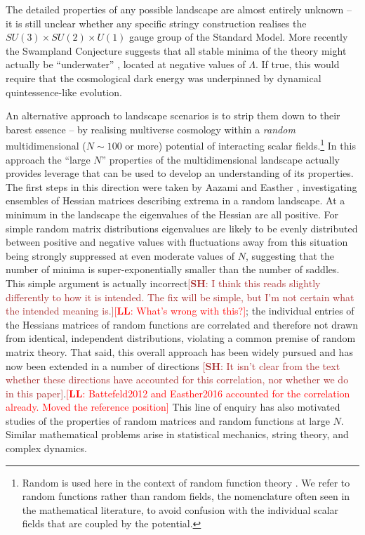 \documentclass[12pt]{article}
\newcommand{\lfl}[1]{\textcolor{red}{[{\bf LL}: #1]}}
\newcommand{\SH}[1]{\textcolor{brown}{[{\bf SH}: #1]}}
\begin{document}
The detailed properties of any possible landscape are almost entirely unknown -- it is still unclear whether any specific stringy construction  realises  the $SU(3) \times SU(2) \times U(1)$ gauge group of the Standard Model.  More recently the Swampland Conjecture suggests that all stable minima of the theory might actually be ``underwater'' \cite{Agrawal2018},  located at negative values of $\Lambda$. If true, this would require that the cosmological dark energy was underpinned by dynamical quintessence-like evolution.  

An alternative approach to   landscape scenarios is to strip them down to their barest essence -- by realising multiverse cosmology within a {\em random\/} multidimensional ($N\sim100$ or more) potential of interacting scalar fields.\footnote{Random is used here in the  context of random function theory \cite{GRF1, GRF2, GRF3}.  We refer to random functions rather than random fields, the nomenclature often seen in the mathematical literature, to avoid confusion with the individual scalar fields that are coupled by the potential.}  In this approach the ``large $N$'' properties of the multidimensional landscape actually provides leverage that can be used to develop an understanding of its properties. The first steps in this direction were taken by Aazami and Easther \cite{Aazami2006}, investigating ensembles of Hessian matrices describing extrema in a random landscape.  At  a minimum in the landscape the eigenvalues of the Hessian are all positive. For simple random matrix distributions eigenvalues are likely to be evenly distributed between positive and negative values with fluctuations away from this situation being strongly suppressed at even moderate values of $N$, suggesting that the number of minima is super-exponentially smaller than the number of saddles. This simple argument is actually incorrect\SH{I think this reads slightly differently to how it is intended. The fix will be simple, but I'm not certain what the intended meaning is.}\lfl{What's wrong with this?}; the individual entries of the Hessians matrices of random functions are correlated and therefore not drawn from identical, independent distributions,\cite{Battefeld2012,Easther2016} violating a common premise of random matrix theory. That said, this overall approach has been widely pursued and has now been extended in a number of directions \cite{Easther2006, Frazer2011, Henry2009, Marsh2013, Agarwal2011,Yang2012,Masoumi2016,Yamada2018}\SH{It isn't clear from the text whether these directions have accounted for this correlation, nor whether we do in this paper}.\lfl{Battefeld2012 and Easther2016 accounted for the correlation already. Moved the reference position} This line of enquiry has also motivated studies of the properties of random matrices and random functions at large $N$.\cite{Bray2007,Dean2008,Majumdar2009,Bachlechner2014,Battefeld2012,Fyodorov2013,Masoumi2017} Similar mathematical problems arise in statistical mechanics, string theory, and complex dynamics.\cite{Fyodorov2004,Douglas2004,Douglas2006,Fyodorov2007,Fyodorov2012,Fyodorov2018,Ros2019}
\end{document}
